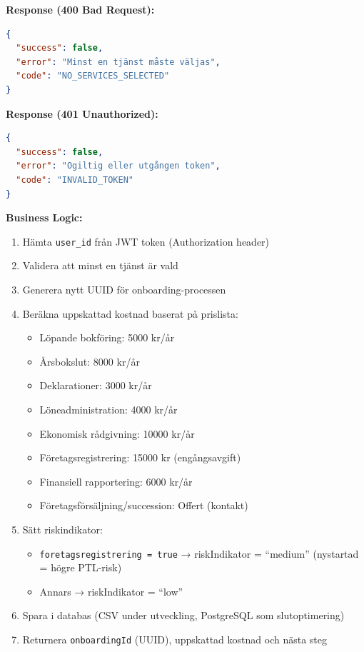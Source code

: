 \documentclass[12pt,a4paper]{article}
\begin{document}
\textbf{Response (400 Bad Request):}
\begin{lstlisting}[language=json]
{
  "success": false,
  "error": "Minst en tjänst måste väljas",
  "code": "NO_SERVICES_SELECTED"
}
\end{lstlisting}

\textbf{Response (401 Unauthorized):}
\begin{lstlisting}[language=json]
{
  "success": false,
  "error": "Ogiltig eller utgången token",
  "code": "INVALID_TOKEN"
}
\end{lstlisting}

\textbf{Business Logic:}
\begin{enumerate}[noitemsep]
  \item Hämta \texttt{user\_id} från JWT token (Authorization header)
  \item Validera att minst en tjänst är vald
  \item Generera nytt UUID för onboarding-processen
  \item Beräkna uppskattad kostnad baserat på prislista:
    \begin{itemize}[noitemsep]
      \item Löpande bokföring: 5000 kr/år
      \item Årsbokslut: 8000 kr/år
      \item Deklarationer: 3000 kr/år
      \item Löneadministration: 4000 kr/år
      \item Ekonomisk rådgivning: 10000 kr/år
      \item Företagsregistrering: 15000 kr (engångsavgift)
      \item Finansiell rapportering: 6000 kr/år
      \item Företagsförsäljning/succession: Offert (kontakt)
    \end{itemize}
  \item Sätt riskindikator:
    \begin{itemize}[noitemsep]
      \item \texttt{foretagsregistrering = true} → riskIndikator = \enquote{medium} (nystartad = högre PTL-risk)
      \item Annars → riskIndikator = \enquote{low}
    \end{itemize}
  \item Spara i databas (CSV under utveckling, PostgreSQL som slutoptimering)
  \item Returnera \texttt{onboardingId} (UUID), uppskattad kostnad och nästa steg
\end{enumerate}
\end{document}
